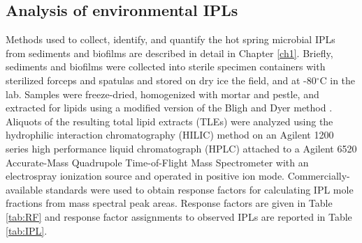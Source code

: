 \subsection{Analysis of environmental IPLs} Methods used to collect, identify, and quantify the hot spring microbial IPLs from sediments and biofilms are described in detail in Chapter \ref{ch1}. Briefly, sediments and biofilms were collected into sterile specimen containers with sterilized forceps and spatulas and stored on dry ice the field, and at -80$^{\circ}$C in the lab. Samples were freeze-dried, homogenized with mortar and pestle, and extracted for lipids using a modified version of the Bligh and Dyer method \citep{white1998signature}. Aliquots of the resulting total lipid extracts (TLEs) were analyzed using the hydrophilic interaction chromatography (HILIC) method \citep{Wrmer_Application_2013} on an Agilent 1200 series high performance liquid chromatograph (HPLC) attached to a Agilent 6520 Accurate-Mass Quadrupole Time-of-Flight Mass Spectrometer with an electrospray ionization source and operated in positive ion mode. Commercially-available standards were used to obtain response factors for calculating IPL mole fractions from mass spectral peak areas. Response factors are given in Table \ref{tab:RF} and response factor assignments to observed IPLs are reported in Table \ref{tab:IPL}.

